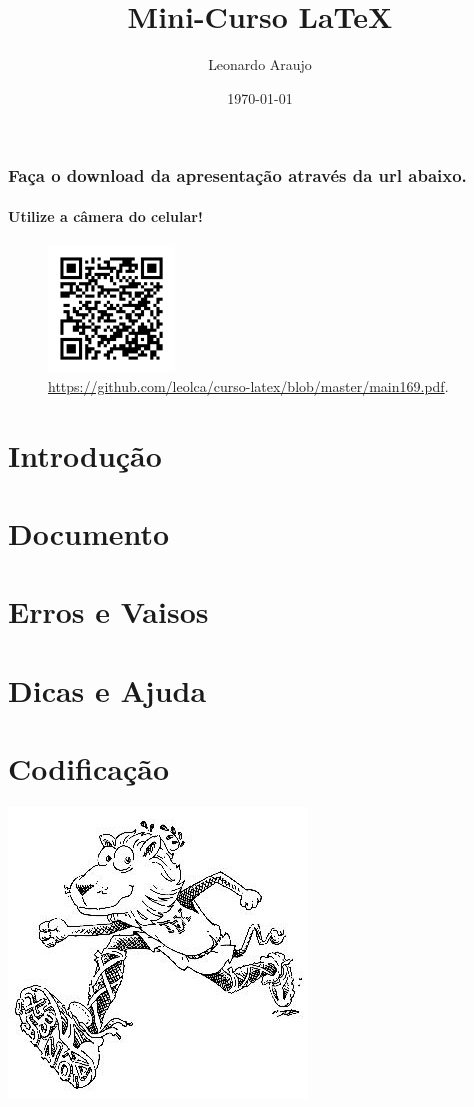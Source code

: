 \documentclass[xcolor={table},aspectratio=169]{beamer}
\title[Mini-Curso \LaTeX{}]{Mini-Curso \LaTeX{}}
\author{Leonardo Araujo}
\date{\today}
\institute{UFSJ}
\begin{document}
\begin{frame}[plain]
\maketitle
\end{frame}


\begin{frame}
\frametitle{Faça o download da apresentação através da url abaixo.}
\framesubtitle{Utilize a câmera do celular!}
  \begin{figure}[h!]
  \centering
  \includegraphics[width=0.3\textwidth]{figures/qrcode-curso-latex-169.png}
  \caption{\url{https://github.com/leolca/curso-latex/blob/master/main169.pdf}.}
  \label{fig:qrcode}
  \end{figure}
\end{frame}

\section{Introdução}\label{sec:intro}


\section{Documento}\label{sec:doc}


\section{Erros e Vaisos}\label{sec:errors}


\section{Dicas e Ajuda}\label{sec:ajuda}


\section{Codificação}\label{sec:digitalcoding}




\label{bibliografia}
\nocite{*}

\vspace{15em}
\begin{flushright}
\includegraphics[width=0.3\linewidth]{figures/lion04.png}
\end{flushright}
\end{document}
